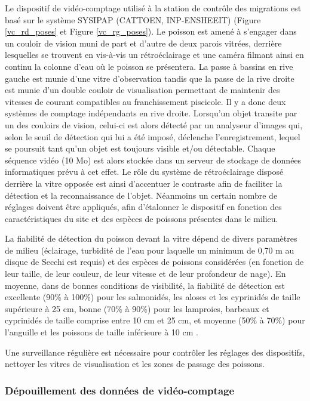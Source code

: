 \documentclass[11pt,titlepage,twoside]{article}\usepackage[]{graphicx}\usepackage[table]{xcolor}
\begin{document}
Le dispositif de vidéo-comptage utilisé à la station de contrôle des migrations est basé sur le système SYSIPAP (CATTOEN, INP-ENSHEEIT) (Figure \ref{vc_rd_poses} et Figure \ref{vc_rg_poses}). Le poisson est amené à s'engager dans un couloir de vision muni de part et d'autre de deux parois vitrées, derrière lesquelles se trouvent en vis-à-vis un rétroéclairage et une caméra filmant ainsi en continu la colonne d'eau où le poisson se présentera. La passe à bassins en rive gauche est munie d'une vitre d'observation tandis que la passe de la rive droite est munie d'un double couloir de visualisation permettant de maintenir des vitesses de courant compatibles au franchissement piscicole. Il y a donc deux systèmes de comptage indépendants en rive droite. Lorsqu'un objet transite par un des couloirs de vision, celui-ci est alors détecté par un analyseur d'images qui, selon le seuil de détection qui lui a été imposé, déclenche l'enregistrement, lequel se poursuit tant qu'un objet est toujours visible et/ou détectable. Chaque séquence vidéo (10 Mo) est alors stockée dans un serveur de stockage de données informatiques prévu à cet effet. Le rôle du système de rétroéclairage disposé derrière la vitre opposée est ainsi d'accentuer le contraste afin de faciliter la détection et la reconnaissance de l'objet. Néanmoins un certain nombre de réglages doivent être appliqués, afin d'étalonner le dispositif en fonction des caractéristiques du site et des espèces de poissons présentes dans le milieu.

La fiabilité de détection du poisson devant la vitre dépend de divers paramètres de milieu (éclairage, turbidité de l'eau pour laquelle un minimum de 0,70 m au disque de Secchi est requis) et des espèces de poissons considérées (en fonction de leur taille, de leur couleur, de leur vitesse et de leur profondeur de nage). En moyenne, dans de bonnes conditions de visibilité, la fiabilité de détection est excellente (90\% à 100\%) pour les salmonidés, les aloses et les cyprinidés de taille supérieure à 25 cm, bonne (70\% à 90\%) pour les lamproies, barbeaux et cyprinidés de taille comprise entre 10 cm et 25 cm, et moyenne (50\% à 70\%) pour l'anguille et les poissons de taille inférieure à 10 cm \citep{travade_les_1992}.

Une surveillance régulière est nécessaire pour contrôler les réglages des dispositifs, nettoyer les vitres de visualisation et les zones de passage des poissons.

\subsubsection{Dépouillement des données de vidéo-comptage}
\end{document}
